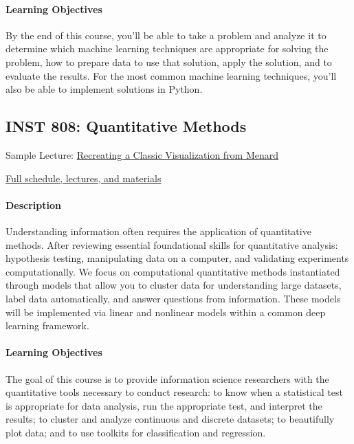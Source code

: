 \documentclass{article}
\begin{document}
\paragraph{Learning Objectives} By the end of this course, you’ll be able to take a problem and analyze it to determine which machine learning techniques are appropriate for solving the problem, how to prepare data to use that solution, apply the solution, and to evaluate the results.  For the most common machine learning techniques, you’ll also be able to implement solutions in Python.



\subsection{INST 808: Quantitative Methods}

\begin{itemize*}
\item Sample Lecture: \href{https://www.youtube.com/watch?v=-lgKvN6kGBk}{Recreating a Classic Visualization from Menard}
  \item \href{http://users.umiacs.umd.edu/~jbg/teaching/INST_808/}{Full schedule, lectures, and materials}
  \end{itemize*}


\paragraph{Description}
Understanding information often requires the application of quantitative methods.  After reviewing essential foundational skills for quantitative analysis: hypothesis testing, manipulating data on a computer, and validating experiments computationally.  We focus on computational quantitative methods instantiated through models that allow you to cluster data for understanding large datasets, label data automatically, and answer questions from information.  These models will be implemented via linear and nonlinear models within a common deep learning framework.

\paragraph{Learning Objectives}
The goal of this course is to provide information science researchers with the quantitative tools necessary to conduct research: to know when a statistical test is appropriate for data analysis, run the appropriate test, and interpret the results; to cluster and analyze continuous and discrete datasets; to beautifully plot data; and to use toolkits for classification and regression.
\end{document}

